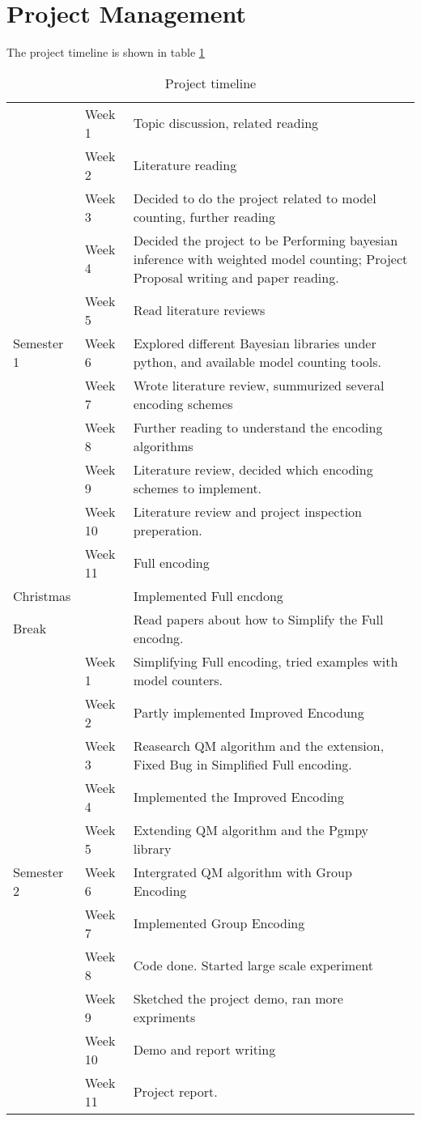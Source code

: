 \newpage
\section{Project Management}
The project timeline is shown in table \ref{tab:timeline}
\begin{table}[]
    \centering
    \begin{tabular}{l | l | p{80mm}}
    \hline
    \hline
    &	Week 1 	&	Topic discussion, related reading	\\
	&	Week 2	&	Literature reading	\\
	&	Week 3	&	Decided to do the project related to model counting, further reading	\\
	&	Week 4	&	Decided the project to be Performing bayesian inference with weighted model counting;  Project Proposal writing and paper reading.	\\
	&	Week 5	&	Read literature reviews	\\
Semester 1	&	Week 6	&	Explored different Bayesian libraries under python, and available model counting tools.	\\
	&	Week 7	&	Wrote literature review, summurized several encoding schemes	\\
	&	Week 8	&	Further reading to understand the encoding algorithms	\\
	&	Week 9	&	Literature review, decided which encoding schemes to implement.	\\
	&	Week 10	&	Literature review and project inspection preperation.	\\
	&	Week 11	&	Full encoding	\\
	\hline
Christmas	&		&	Implemented Full encdong	\\
Break	&		&	Read papers about how to Simplify the Full encodng.	\\
	\hline
	&	Week 1 	&	Simplifying Full encoding, tried examples with model counters.	\\
	&	Week 2	&	Partly implemented Improved Encodung	\\
	&	Week 3	&	Reasearch QM algorithm and the extension, Fixed Bug in Simplified Full encoding.	\\
	&	Week 4	&	Implemented the Improved Encoding	\\
	&	Week 5	&	Extending QM algorithm and the Pgmpy library	\\
Semester 2	&	Week 6	&	Intergrated QM algorithm with Group Encoding	\\
	&	Week 7	&	Implemented Group Encoding	\\
	&	Week 8	&	Code done.  Started large scale experiment	\\
	&	Week 9	&	Sketched the project demo, ran more expriments	\\
	&	Week 10	&	Demo and report writing	\\
	&	Week 11	&	Project report.	\\
	\hline
	\hline
\end{tabular}
    \caption{Project timeline}
    \label{tab:timeline}
\end{table}
